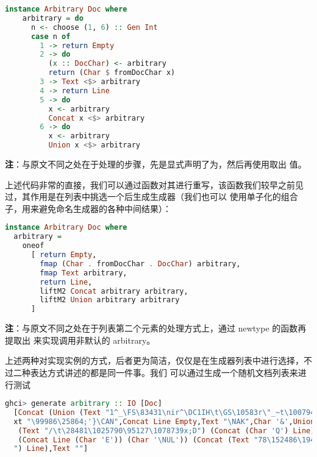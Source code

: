 \documentclass[./main.tex]{subfiles}
\begin{document}
\begin{lstlisting}[language=Haskell]
  instance Arbitrary Doc where
    arbitrary = do
      n <- choose (1, 6) :: Gen Int
      case n of
        1 -> return Empty
        2 -> do
          (x :: DocChar) <- arbitrary
          return (Char $ fromDocChar x)
        3 -> Text <$> arbitrary
        4 -> return Line
        5 -> do
          x <- arbitrary
          Concat x <$> arbitrary
        6 -> do
          x <- arbitrary
          Union x <$> arbitrary
\end{lstlisting}

\textbf{注}：与原文不同之处在于处理的步骤，先是显式声明了为，然后再使用取出
值。

上述代码非常的直接，我们可以通过函数对其进行重写，该函数我们较早之前见过，其作用是在列表中挑选一个后生成生成器（我们也可以
使用单子化的组合子，用来避免命名生成器的各种中间结果）：

\begin{lstlisting}[language=Haskell]
  instance Arbitrary Doc where
  arbitrary =
    oneof
      [ return Empty,
        fmap (Char . fromDocChar . DocChar) arbitrary,
        fmap Text arbitrary,
        return Line,
        liftM2 Concat arbitrary arbitrary,
        liftM2 Union arbitrary arbitrary
      ]
\end{lstlisting}

\textbf{注}：与原文不同之处在于列表第二个元素的处理方式上，通过 newtype 的函数再提取出
来实现调用非默认的 arbitrary。

上述两种对实现实例的方式，后者更为简洁，仅仅是在生成器列表中进行选择，不过二种表达方式讲述的都是同一件事。我们
可以通过生成一个随机文档列表来进行测试

\begin{lstlisting}[language=Haskell]
  ghci> generate arbitrary :: IO [Doc]
  [Concat (Union (Text "1^_\FS\83431\nir^\DC1IH\t\GS\10583r\"_~t\1007943(\1091024\180519\ETX\53558y\998555") Line) (Union (Text "s4hxR(\1108184") Empty),Empty,Empty,Char '&',Char 'D',Empty,Line,Empty,Line,Char '>',Te
  xt "\99986\25864;'}\CAN",Concat Line Empty,Text "\NAK",Char '&',Union Empty (Concat (Char '\998638') (Union
   (Text "/\t\28481\1025790\95127\1078739x;D") (Concat (Char 'Q') Line))),Empty,Concat Line (Text "Gwj^v\1032477\EOT\58278k},`<\1016570\59993:Y>\1074673q;A \7956\127844"),Empty,Concat Empty (Text "\199725\SIl(<\176480\133060,A\FSu\EM>\DC1\SYN\1102841\RS\STX\DELim\n\"|\1106202De\n#"),Char 'J',Union Empty Line,Concat (Union
   (Concat Line (Char 'E')) (Char '\NUL')) (Concat (Text "78\152486\194828?vy\157411\\1*\DC1\NAK\NULrd\SYN:\t
  ") Line),Text ""]
\end{lstlisting}
\end{document}
